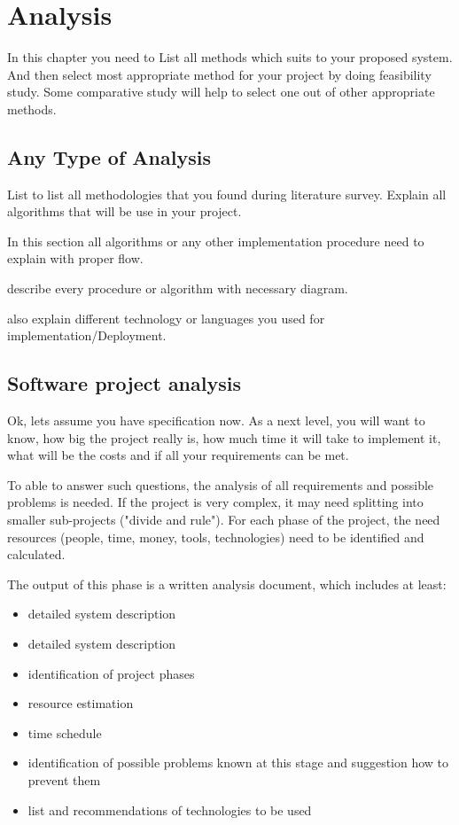 \graphicspath{ {images/} }
\chapter{Analysis}
\hspace{5mm} In this chapter you need to  List all methods which suits to your proposed system. And then select most appropriate method for your project by doing feasibility study.
Some comparative study will help to select one out of other appropriate methods.

\section{Any Type of Analysis} 
List to list all methodologies that you found during literature survey. Explain all algorithms that will be use in your project.

\hspace{5mm}In this section all algorithms or any other implementation procedure need to explain with proper flow.
\par describe every procedure or algorithm with necessary diagram.
\par also explain different technology or languages you used for implementation/Deployment.


\section{Software project analysis}
Ok, lets assume you have specification now. As a next level, you will want to know, how big the project really is, how much time it will take to implement it, what will be the costs and if all your requirements can be met.

To able to answer such questions, the analysis of all requirements and possible problems is needed. If the project is very complex, it may need splitting into smaller sub-projects ("divide and rule"). For each phase of the project, the need resources (people, time, money, tools, technologies) need to be identified and calculated.

The output of this phase is a written analysis document, which includes at least:

\begin{itemize}
    \item detailed system description
    \item detailed system description
    \item identification of project phases
    \item resource estimation
    \item time schedule
    \item identification of possible problems known at this stage and suggestion how to prevent them
    \item list and recommendations of technologies to be used
\end{itemize}
